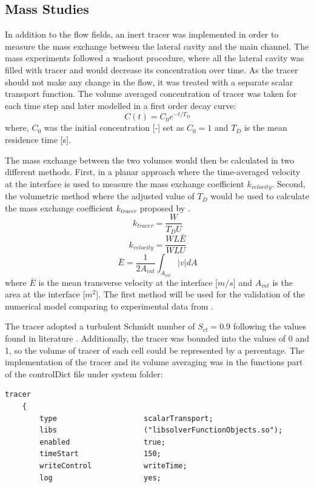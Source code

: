 \begin{refsection}
\subsection{Mass Studies}
In addition to the flow fields, an inert tracer was implemented in order to measure the mass exchange between the lateral cavity and the main channel. The mass experiments followed a washout procedure, where all the lateral cavity was filled with tracer and would decrease its concentration over time. As the tracer should not make any change in the flow, it was treated with a separate scalar transport function. The volume averaged concentration of tracer was taken for each time step and later modelled in a first order decay curve:
\begin{equation}
C(t)=C_0e^{-t/T_D}
\end{equation}
where, $C_0$ was the initial concentration [-] set as $C_0=1$ and $T_D$ is the mean residence time [s].

The mass exchange between the two volumes would then be calculated in two different methods. First, in a planar approach where the time-averaged velocity at the interface is used to measure the mass exchange coefficient $k_{velocity}$. Second, the volumetric method where the adjusted value of $T_D$ would be used to calculate the mass exchange coefficient $k_{tracer}$ proposed by \textcite{weitbrecht2001}.
\begin{equation}
k_{tracer}=\frac{W}{T_D U}
\end{equation}
\begin{equation}
k_{velocity}=\frac{W L \bar{E}}{W L U}
\end{equation}
\begin{equation}
\bar{E}=\frac{1}{2A_{int}}\int_{A_{int}}|v| dA
\end{equation}
where $\bar{E}$ is the mean transverse velocity at the interface [$m/s$] and $A_{int}$ is the area at the interface [$m^2$]. The first method will be used for the validation of the numerical model comparing to experimental data from \textcite{xiang2019}.

The tracer adopted a turbulent Schmidt number of $S_{ct}=0.9$ following the values found in literature \cite{gualtieri2010}. Additionally, the tracer was bounded into the values of 0 and 1, so the volume of tracer of each cell could be represented by a percentage. The implementation of the tracer and its volume averaging was in the functions part of the controlDict file under system folder:
\begin{lstlisting}
tracer
	{
		type 					scalarTransport;
		libs					("libsolverFunctionObjects.so");
		enabled					true;
		timeStart				150;
		writeControl			writeTime;
		log						yes;


\end{lstlisting}
\end{refsection}
